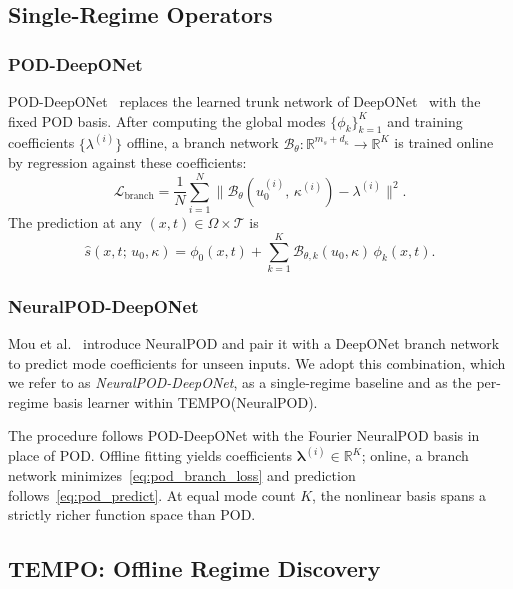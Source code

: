 \documentclass[preprint,10pt]{elsarticle}
\begin{document}
\subsection{Single-Regime Operators}\label{sec:single}


\subsubsection{POD-DeepONet}

POD-DeepONet~\cite{Lu2022} replaces the learned trunk network of
DeepONet~\cite{Lu2019} with the fixed POD basis.
After computing the global modes $\{\phi_k\}_{k=1}^K$ and training
coefficients $\{\lambda^{(i)}\}$ offline, a branch network
$\mathcal{B}_\theta : \mathbb{R}^{m_s + d_\kappa} \to \mathbb{R}^K$
is trained online by regression against these coefficients:
\begin{equation}
  \mathcal{L}_{\mathrm{branch}}
  = \frac{1}{N}\sum_{i=1}^{N}
    \bigl\|\mathcal{B}_\theta(u_0^{(i)},\,\kappa^{(i)})
    - \lambda^{(i)}\bigr\|^2.
  \label{eq:pod_branch_loss}
\end{equation}
The prediction at any $(x,t) \in \Omega \times \mathcal{T}$ is
\begin{equation}
  \hat{s}(x,t;\,u_0,\kappa)
  = \phi_0(x,t)
  + \sum_{k=1}^{K}
    \mathcal{B}_{\theta,k}(u_0,\kappa)\,\phi_k(x,t).
  \label{eq:pod_predict}
\end{equation}

\subsubsection{NeuralPOD-DeepONet}\label{sec:neuralpod_deeponet}

Mou et al.~\cite{Mou2026} introduce NeuralPOD and pair it with a
DeepONet branch network to predict mode coefficients for unseen inputs.
We adopt this combination, which we refer to as \emph{NeuralPOD-DeepONet},
as a single-regime baseline and as the per-regime basis learner within TEMPO(NeuralPOD).

The procedure follows POD-DeepONet with the Fourier NeuralPOD basis in place of POD.
Offline fitting yields coefficients $\boldsymbol{\lambda}^{(i)} \in \mathbb{R}^K$; online, a branch network minimizes~\eqref{eq:pod_branch_loss} and prediction follows~\eqref{eq:pod_predict}.
At equal mode count $K$, the nonlinear basis spans a strictly richer function space than POD.


\subsection{TEMPO: Offline Regime Discovery}\label{sec:offline}
\end{document}
